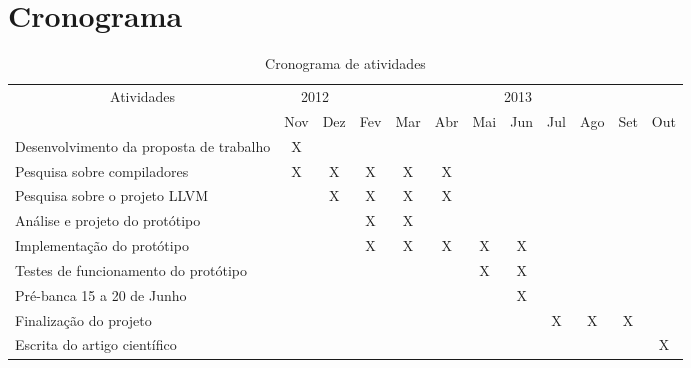 \chapter{Cronograma}
\label{pro:cronograma}

{\renewcommand{\arraystretch}{1.3}

\begin{table}[htbp]\footnotesize
  \begin{center}
    \begin{tabular}{|p{5cm}|c|c|c|c|c|c|c|c|c|c|c|} \hline
      \multicolumn{ 1}{|c|}{Atividades} & \multicolumn{ 2}{c|}{2012} & \multicolumn{ 9}{c|}{2013} \\ \cline{ 2- 12}
      \multicolumn{ 1}{|l|}{} & \multicolumn{1}{l|}{Nov} & \multicolumn{1}{l|}{Dez} & \multicolumn{1}{l|}{Fev} & \multicolumn{1}{l|}{Mar} & \multicolumn{1}{l|}{Abr} & \multicolumn{1}{l|}{Mai} & \multicolumn{1}{l|}{Jun} & \multicolumn{1}{l|}{Jul} & \multicolumn{1}{l|}{Ago} & \multicolumn{1}{l|}{Set} & \multicolumn{1}{l|}{Out} \\ \hline
      Desenvolvimento da proposta de trabalho & X &  &  &  &  &  &  &  &  &  &  \\ \hline
      Pesquisa sobre compiladores & X & X & X & X & X &  &  &  &  &  &  \\ \hline
      Pesquisa sobre o projeto LLVM &  & X & X & X & X &  &  &  &  &  &  \\ \hline
      Análise e projeto do protótipo &  &  & X & X &  &  &  &  &  &  &  \\ \hline
      Implementação do protótipo &  &  & X & X & X & X & X &  &  &  &  \\ \hline
      Testes de funcionamento do protótipo &  &  &  &  &  & X & X &  &  &  &  \\ \hline
      Pré-banca 15 a 20 de Junho &  &  &  &  &  &  & X &  &  &  &  \\ \hline
      Finalização do projeto &  &  &  &  &  &  &  & X & X & X &  \\ \hline
      Escrita do artigo científico &  &  &  &  &  &  &  &  &  &  & X \\ \hline
    \end{tabular}
  \end{center}
  \caption{Cronograma de atividades}
  \label{pro:tabela-cronograma}
\end{table}

} \quad
